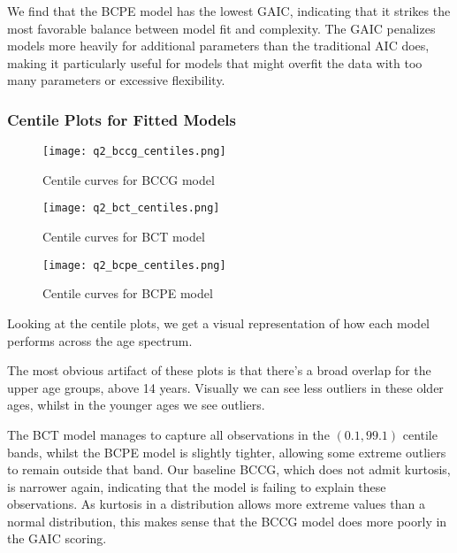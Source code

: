 We find that the BCPE model has the lowest GAIC, indicating that it strikes the most favorable balance between model
fit and complexity. The GAIC penalizes models more heavily
for additional parameters than the traditional AIC does, making it particularly useful for models that might overfit
the data with too many parameters or excessive flexibility.

\subsubsection{Centile Plots for Fitted Models}

\begin{figure}[H]
  \texttt{[image: q2\_bccg\_centiles.png]}
  \caption{Centile curves for BCCG model}
\end{figure}


\begin{figure}[H]
  \texttt{[image: q2\_bct\_centiles.png]}
  \caption{Centile curves for BCT model}
\end{figure}



\begin{figure}[H]
  \texttt{[image: q2\_bcpe\_centiles.png]}
  \caption{Centile curves for BCPE model}
\end{figure}

Looking at the centile plots, we get a visual representation of how each model performs across the age spectrum.

The most obvious artifact of these plots is that there's a broad overlap for the upper age groups, above 14 years.  Visually
we can see less outliers in these older ages, whilst in the younger ages we see outliers.

The BCT model manages to capture all observations in the $(0.1, 99.1)$ centile bands, whilst the BCPE model is slightly
tighter, allowing some extreme outliers to remain outside that band.  Our baseline BCCG, which does not admit kurtosis, is
narrower again, indicating that the model is failing to explain these observations.  As kurtosis in a distribution allows
more extreme values than a normal distribution, this makes sense that the BCCG model does more poorly in the GAIC scoring.
